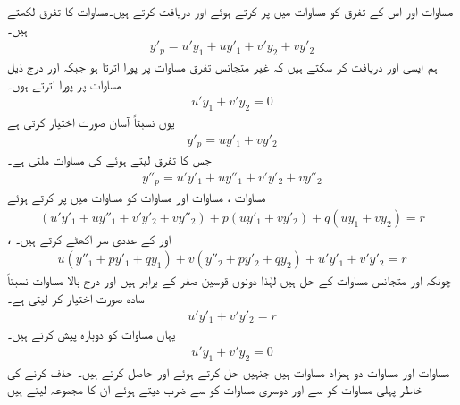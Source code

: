 مساوات  اور اس کے تفرق کو مساوات  میں پر کرتے ہوئے  اور  دریافت کرتے ہیں۔مساوات  کا تفرق لکھتے ہیں۔
\begin{align*}
y'_p=u'y_1+uy'_1+v'y_2+vy'_2
\end{align*}
ہم ایسی  اور  دریافت کر سکتے ہیں کہ  غیر متجانس تفرق مساوات پر پورا اترتا ہو جبکہ  اور  درج ذیل مساوات پر پورا اترتے ہوں۔
\begin{align}\label{مساوات_سادہ_دو_تبدیلی_متغیرات_الف}
u'y_1+v'y_2=0
\end{align}
یوں  نسبتاً آسان صورت اختیار کرتی ہے
\begin{align}\label{مساوات_سادہ_دو_غیر_متجانس_خطی_ث}
y'_p=uy'_1+vy'_2
\end{align}
جس کا تفرق لیتے ہوئے  کی مساوات ملتی ہے۔
\begin{align}\label{مساوات_سادہ_دو_غیر_متجانس_خطی_ج}
y''_p=u'y'_1+uy''_1+v'y'_2+vy''_2
\end{align}
مساوات ، مساوات  اور مساوات  کو مساوات  میں پر کرتے  ہوئے
\begin{align*}
(u'y'_1+uy''_1+v'y'_2+vy''_2) +p(uy'_1+vy'_2)+q(uy_1+vy_2)=r
\end{align*}
، اور  کے عددی سر اکھٹے کرتے ہیں۔
\begin{align*}
u(y''_1+py'_1+qy_1)+v(y''_2+py'_2+qy_2)+u'y'_1+v'y'_2=r
\end{align*}
چونکہ  اور  متجانس مساوات  کے حل ہیں لہٰذا دونوں قوسین صفر کے برابر ہیں اور درج بالا مساوات نسبتاً سادہ صورت اختیار کر لیتی ہے۔
\begin{align}\label{مساوات_سادہ_دو_تبدیلی_متغیرات_ب}
u'y'_1+v'y'_2=r
\end{align}
یہاں مساوات  کو دوبارہ پیش کرتے ہیں۔
\begin{align}\label{مساوات_سادہ_دو_تبدیلی_متغیرات_پ}
u'y_1+v'y_2=0
\end{align}
مساوات  اور مساوات  دو ہمزاد مساوات ہیں جنہیں حل کرتے ہوئے  اور  حاصل کرتے ہیں۔  حذف کرنے کی خاطر پہلی مساوات کو  سے اور دوسری مساوات کو  سے ضرب دیتے ہوئے ان کا مجموعہ لیتے ہیں
